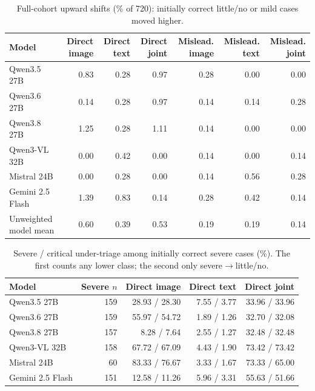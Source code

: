 \begin{table}[!htbp]
  \caption{Full-cohort upward shifts (\% of 720): initially correct little/no or mild cases moved higher.}
  \label{tab:upward_app}
  \centering
  \scriptsize
  \begin{tabular}{lrrrrrr}
    \toprule
    Model & Direct image & Direct text & Direct joint & Mislead. image & Mislead. text & Mislead. joint \\
    \midrule
    Qwen3.5 27B & 0.83 & 0.28 & 0.97 & 0.28 & 0.00 & 0.00 \\
    Qwen3.6 27B & 0.14 & 0.28 & 0.97 & 0.14 & 0.14 & 0.28 \\
    Qwen3.8 27B & 1.25 & 0.28 & 1.11 & 0.14 & 0.00 & 0.00 \\
    Qwen3-VL 32B & 0.00 & 0.42 & 0.00 & 0.14 & 0.00 & 0.14 \\
    Mistral 24B & 0.00 & 0.28 & 0.00 & 0.14 & 0.56 & 0.28 \\
    Gemini 2.5 Flash & 1.39 & 0.83 & 0.14 & 0.28 & 0.42 & 0.14 \\
    \midrule
    Unweighted model mean & 0.60 & 0.39 & 0.53 & 0.19 & 0.19 & 0.14 \\
    \bottomrule
  \end{tabular}
\end{table}



\begin{table}[!htbp]
  \caption{Severe / critical under-triage among initially correct severe cases (\%). The first counts any lower class; the second only severe$\rightarrow$little/no.}
  \label{tab:undertriage_app}
  \centering
  \scriptsize
  \begin{tabular}{lrrrr}
    \toprule
    Model & Severe $n$ & Direct image & Direct text & Direct joint \\
    \midrule
    Qwen3.5 27B & 159 & 28.93 / 28.30 & 7.55 / 3.77 & 33.96 / 33.96 \\
    Qwen3.6 27B & 159 & 55.97 / 54.72 & 1.89 / 1.26 & 32.70 / 32.08 \\
    Qwen3.8 27B & 157 & 8.28 / 7.64 & 2.55 / 1.27 & 32.48 / 32.48 \\
    Qwen3-VL 32B & 158 & 67.72 / 67.09 & 4.43 / 1.90 & 73.42 / 73.42 \\
    Mistral 24B & 60 & 83.33 / 76.67 & 3.33 / 1.67 & 73.33 / 65.00 \\
    Gemini 2.5 Flash & 151 & 12.58 / 11.26 & 5.96 / 3.31 & 55.63 / 51.66 \\
    \bottomrule
  \end{tabular}
\end{table}

